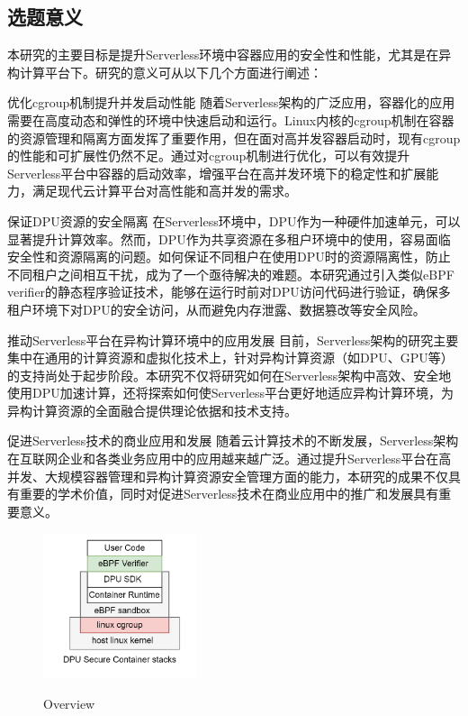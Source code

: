 \subsection{选题意义}
本研究的主要目标是提升Serverless环境中容器应用的安全性和性能，尤其是在异构计算平台下。研究的意义可从以下几个方面进行阐述：

优化cgroup机制提升并发启动性能
随着Serverless架构的广泛应用，容器化的应用需要在高度动态和弹性的环境中快速启动和运行。Linux内核的cgroup机制在容器的资源管理和隔离方面发挥了重要作用，但在面对高并发容器启动时，现有cgroup的性能和可扩展性仍然不足。通过对cgroup机制进行优化，可以有效提升Serverless平台中容器的启动效率，增强平台在高并发环境下的稳定性和扩展能力，满足现代云计算平台对高性能和高并发的需求。

保证DPU资源的安全隔离
在Serverless环境中，DPU作为一种硬件加速单元，可以显著提升计算效率。然而，DPU作为共享资源在多租户环境中的使用，容易面临安全性和资源隔离的问题。如何保证不同租户在使用DPU时的资源隔离性，防止不同租户之间相互干扰，成为了一个亟待解决的难题。本研究通过引入类似eBPF verifier的静态程序验证技术，能够在运行时前对DPU访问代码进行验证，确保多租户环境下对DPU的安全访问，从而避免内存泄露、数据篡改等安全风险。

推动Serverless平台在异构计算环境中的应用发展
目前，Serverless架构的研究主要集中在通用的计算资源和虚拟化技术上，针对异构计算资源（如DPU、GPU等）的支持尚处于起步阶段。本研究不仅将研究如何在Serverless架构中高效、安全地使用DPU加速计算，还将探索如何使Serverless平台更好地适应异构计算环境，为异构计算资源的全面融合提供理论依据和技术支持。

促进Serverless技术的商业应用和发展
随着云计算技术的不断发展，Serverless架构在互联网企业和各类业务应用中的应用越来越广泛。通过提升Serverless平台在高并发、大规模容器管理和异构计算资源安全管理方面的能力，本研究的成果不仅具有重要的学术价值，同时对促进Serverless技术在商业应用中的推广和发展具有重要意义。

\captionsetup[figure]{justification=justified}
\begin{figure}
	\centering
		\includegraphics[width=0.4\textwidth]{figures/figure0}
 \label{fig:Overview-1}
 \caption{Overview}
\end{figure}



